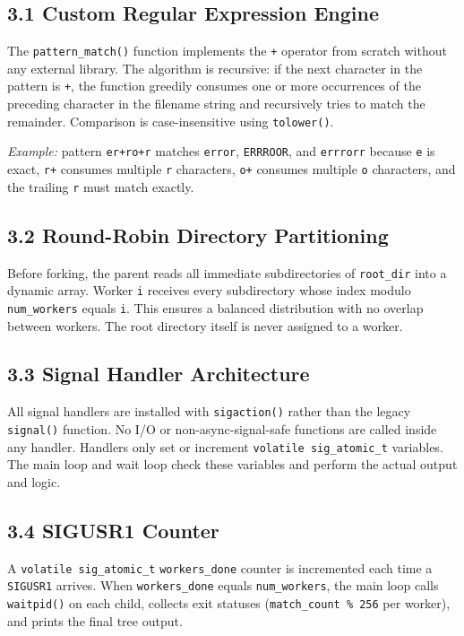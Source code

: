 \documentclass[12pt, a4paper]{article}
\begin{document}
\subsection{3.1 Custom Regular Expression Engine}

The \texttt{pattern\_match()} function implements the \texttt{+} operator from scratch without any external library. The algorithm is recursive: if the next character in the pattern is \texttt{+}, the function greedily consumes one or more occurrences of the preceding character in the filename string and recursively tries to match the remainder. Comparison is case-insensitive using \texttt{tolower()}.

\textit{Example:} pattern \texttt{er+ro+r} matches \texttt{error}, \texttt{ERRROOR}, and \texttt{errrorr} because \texttt{e} is exact, \texttt{r+} consumes multiple \texttt{r} characters, \texttt{o+} consumes multiple \texttt{o} characters, and the trailing \texttt{r} must match exactly.

\subsection{3.2 Round-Robin Directory Partitioning}

Before forking, the parent reads all immediate subdirectories of \texttt{root\_dir} into a dynamic array. Worker \texttt{i} receives every subdirectory whose index modulo \texttt{num\_workers} equals \texttt{i}. This ensures a balanced distribution with no overlap between workers. The root directory itself is never assigned to a worker.

\subsection{3.3 Signal Handler Architecture}

All signal handlers are installed with \texttt{sigaction()} rather than the legacy \texttt{signal()} function. No I/O or non-async-signal-safe functions are called inside any handler. Handlers only set or increment \texttt{volatile sig\_atomic\_t} variables. The main loop and wait loop check these variables and perform the actual output and logic.

\subsection{3.4 SIGUSR1 Counter}

A \texttt{volatile sig\_atomic\_t} \texttt{workers\_done} counter is incremented each time a \texttt{SIGUSR1} arrives. When \texttt{workers\_done} equals \texttt{num\_workers}, the main loop calls \texttt{waitpid()} on each child, collects exit statuses (\texttt{match\_count \% 256} per worker), and prints the final tree output.
\end{document}
